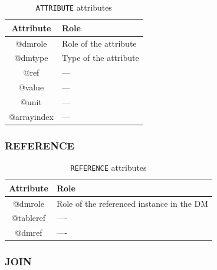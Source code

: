 \documentclass[11pt,a4paper]{ivoa}
\begin{document}
\begin{table}[!htbp]
\small
\centering
\begin{tabulary}{\linewidth}{|c|J|}       
       \hline 
            \textbf{Attribute} & 
            \textbf {Role}\\
       \hline         \hline  
            @dmrole & 
            Role of the attribute \\
        \hline 
            @dmtype & 
            Type of the attribute \\
        \hline 
            @ref & 
            --- \\
        \hline 
            @value& 
            --- \\
        \hline 
            @unit & 
            --- \\
        \hline 
            @arrayindex& 
            --- \\
        \hline 
     \end{tabulary}
     \caption{\texttt{ATTRIBUTE} attributes} 
     \label{tbl:attribute-att}
 \end{table}



\FloatBarrier

\subsubsection{REFERENCE}

\begin{table}[!htbp]
\small
\centering
\begin{tabulary}{\linewidth}{|c|J|}       
       \hline 
            \textbf{Attribute} & 
            \textbf {Role}\\
       \hline         \hline  
            @dmrole & 
            Role of the referenced instance in the DM \\
        \hline 
            @tableref& 
            ---- \\
        \hline 
            @dmref & 
            ---- \\
        \hline 
     \end{tabulary}
     \caption{\texttt{REFERENCE} attributes} 
     \label{tbl:reference-att}
 \end{table}


\FloatBarrier

\subsubsection{JOIN}
\end{document}
